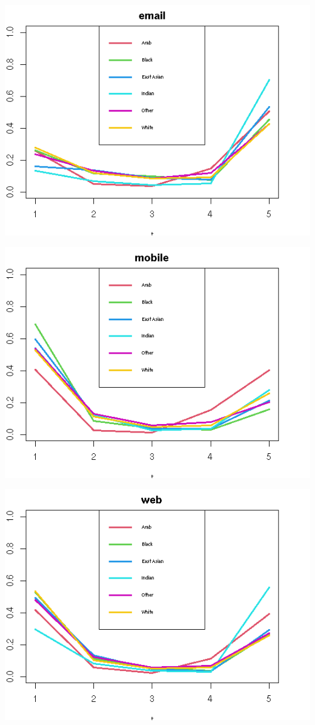 \documentclass{amsart}
\begin{document}
\includegraphics[scale=0.4]{infoemail.png}

\includegraphics[scale=0.4]{infomob.png}


\includegraphics[scale=0.4]{infoweb.png}
\end{document}
